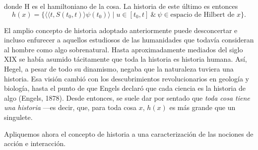 \begin{justifying}
    \newpage

    \noindent donde H es el hamiltoniano de la cosa. La historia de este último es entonces
    \[
        h(x) = \{\langle \langle t, S(t_0, t) \rangle \psi(t_0) \rangle \mid u \in [t_0, t] \ \& \ \psi \in \text{espacio de Hilbert de } x\}.
    \]

    El amplio concepto de historia adoptado anteriormente puede desconcertar e 
    incluso enfurecer a aquellos estudiosos de las humanidades que todavía 
    consideran al hombre como algo sobrenatural. Hasta aproximadamente mediados 
    del siglo XIX se había asumido tácitamente que toda la historia es historia 
    humana. Así, Hegel, a pesar de todo su dinamismo, negaba que la naturaleza 
    tuviera una historia. Esa visión cambió con los descubrimientos revolucionarios 
    en geología y biología, hasta el punto de que Engels declaró que cada ciencia 
    es la historia de algo (Engels, 1878). Desde entonces, se suele dar por sentado 
    que \textit{toda cosa tiene una historia} ---es decir, que, para toda cosa $x$, 
    $h(x)$ es más grande que un singulete.

    Apliquemos ahora el concepto de historia a una caracterización de las nociones 
    de acción e interacción.

\end{justifying}
